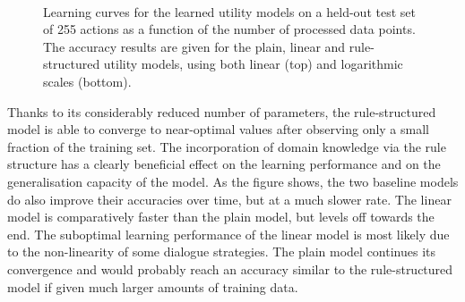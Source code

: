 \begin{figure}[p!]
\begin{center}\end{center} $\phantom{a}$\vspace{1cm}$\phantom{a}$ 
\begin{center}\end{center}
\caption{Learning curves for the learned utility models on a held-out test set of 255 actions as a function of the number of processed data points.  The accuracy results are given for the plain, linear and rule-structured utility models, using both linear (top) and logarithmic scales (bottom).}
\label{results}
\end{figure}


Thanks to its considerably reduced number of parameters, the rule-structured model is able to converge to near-optimal values after observing only a small fraction of the training set.  The incorporation of domain knowledge via the rule structure has a clearly beneficial effect on the learning performance and on the generalisation capacity of the model.  As the figure shows, the two baseline models do also improve their accuracies over time, but at a much slower rate.   The linear model is comparatively faster than the plain model, but levels off towards the end. The suboptimal learning performance of the linear model is most likely due to the non-linearity of some dialogue strategies.  The plain model continues its convergence and would probably reach an accuracy similar to the rule-structured model if given much larger amounts of training data. 

